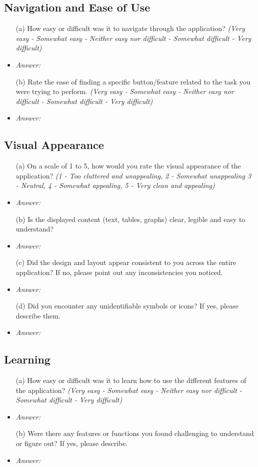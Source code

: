 \documentclass{article}
\begin{document}
\subsection*{\textbf{Navigation and Ease of Use}}
  \begin{itemize}
    \item[(a)] How easy or difficult was it to navigate through the
    application? \textit{(Very easy - Somewhat easy - Neither easy nor difficult
    - Somewhat difficult - Very difficult)}
    \item \emph{Answer:}
    \item[(b)] Rate the ease of finding a specific button/feature related to the
    task you were trying to perform. \textit{(Very easy - Somewhat easy -
    Neither easy nor difficult - Somewhat difficult - Very difficult)}
    \item \emph{Answer:}
  \end{itemize}

\subsection*{\textbf{Visual Appearance}}
  \begin{itemize}
    \item[(a)] On a scale of 1 to 5, how would you rate the visual appearance of
    the application? \textit{(1 - Too cluttered and unappealing, 2 - Somewhat
    unappealing 3 - Neutral, 4 - Somewhat appealing, 5 - Very clean and
    appealing)}
    \item \emph{Answer:}
    \item[(b)] Is the displayed content (text, tables, graphs) clear, legible
    and easy to understand?
    \item \emph{Answer:}
    \item[(c)] Did the design and layout appear consistent to you across
    the entire application? If no, please point out any inconsistencies you noticed.
    \item \emph{Answer:}
    \item[(d)] Did you encounter any unidentifiable symbols or icons? If yes,
    please describe them.
    \item \emph{Answer:}
  \end{itemize}

\subsection*{\textbf{Learning}}
  \begin{itemize}
    \item[(a)] How easy or difficult was it to learn how to use the different
    features of the application? \textit{(Very easy - Somewhat easy - Neither
    easy nor difficult - Somewhat difficult - Very difficult)}
    \item \emph{Answer:}
    \item[(b)] Were there any features or functions you found challenging to
    understand or figure out? If yes, please describe. 
    \item \emph{Answer:}
  \end{itemize}
\end{document}
